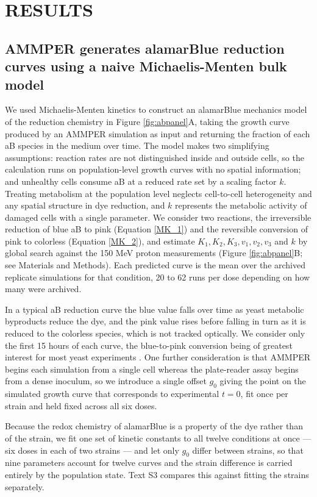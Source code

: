 \documentclass{asmarticle}
\begin{document}
\section{RESULTS}

\subsection{AMMPER generates alamarBlue reduction curves using a naive Michaelis-Menten bulk model}

We used Michaelis-Menten kinetics to construct an alamarBlue mechanics model of the reduction chemistry in Figure \ref{fig:abpanel}A, taking the growth curve produced by an AMMPER simulation as input and returning the fraction of each aB species in the medium over time. The model makes two simplifying assumptions: reaction rates are not distinguished inside and outside cells, so the calculation runs on population-level growth curves with no spatial information; and unhealthy cells consume aB at a reduced rate set by a scaling factor $k$. Treating metabolism at the population level neglects cell-to-cell heterogeneity and any spatial structure in dye reduction, and $k$ represents the metabolic activity of damaged cells with a single parameter. We consider two reactions, the irreversible reduction of blue aB to pink (Equation \ref{MK_1}) and the reversible conversion of pink to colorless (Equation \ref{MK_2}), and estimate $K_1, K_2, K_3, v_1, v_2, v_3$ and $k$ by global search against the 150 MeV proton measurements (Figure \ref{fig:abpanel}B; see Materials and Methods). Each predicted curve is the mean over the archived replicate simulations for that condition, 20 to 62 runs per dose depending on how many were archived.

In a typical aB reduction curve the blue value falls over time as yeast metabolic byproducts reduce the dye, and the pink value rises before falling in turn as it is reduced to the colorless species, which is not tracked optically. We consider only the first 15 hours of each curve, the blue-to-pink conversion being of greatest interest for most yeast experiments \cite{santa2020biosentinel, massaro2023biosentinel}. One further consideration is that AMMPER begins each simulation from a single cell whereas the plate-reader assay begins from a dense inoculum, so we introduce a single offset $g_0$ giving the point on the simulated growth curve that corresponds to experimental $t = 0$, fit once per strain and held fixed across all six doses.

Because the redox chemistry of alamarBlue is a property of the dye rather than of the strain, we fit one set of kinetic constants to all twelve conditions at once --- six doses in each of two strains --- and let only $g_0$ differ between strains, so that nine parameters account for twelve curves and the strain difference is carried entirely by the population state. Text S3 compares this against fitting the strains separately.
\end{document}
